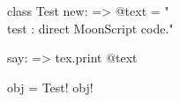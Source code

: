 \documentclass{scrartcl}
\begin{document}

\def\test{More than one line}

\begin{moon}
class Test
  new: =>
    @text = "\\test : direct MoonScript code."
  
  say: =>
    tex.print @text

obj = Test!
obj\say!
\end{moon}

\end{document}
